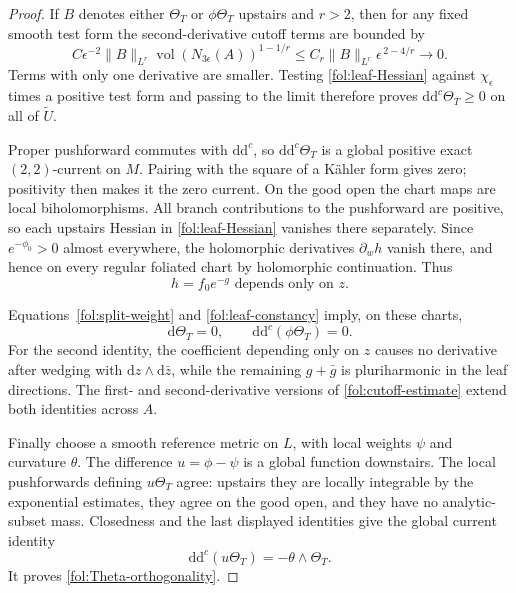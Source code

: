 \documentclass[11pt,letterpaper]{article}
\theoremstyle{definition}
\theoremstyle{remark}
\begin{document}
\begin{proof}
If $B$ denotes either $\Theta_T$ or $\phi\Theta_T$ upstairs and
$r>2$, then for any fixed smooth test form the second-derivative
cutoff terms are bounded by
\begin{equation}\label{fol:cutoff-estimate}
 C\epsilon^{-2}\|B\|_{L^r}
       \operatorname{vol}(N_{3\epsilon}(A))^{1-1/r}
 \leq C_r\|B\|_{L^r}\epsilon^{\,2-4/r}
 \longrightarrow0.
\end{equation}
Terms with only one derivative are smaller.  Testing
\eqref{fol:leaf-Hessian} against $\chi_\epsilon$ times a positive
test form and passing to the limit therefore proves
$\mathrm{d}\mathrm{d}^{c}\Theta_T\geq0$ on all of $\widetilde U$.

Proper pushforward commutes with $\mathrm{d}\mathrm{d}^{c}$, so $\mathrm{d}\mathrm{d}^{c}\Theta_T$ is a
global positive exact $(2,2)$-current on $M$.  Pairing with the square
of a K\"ahler form gives zero; positivity then makes it the zero
current.  On the good open the chart maps are local biholomorphisms.
All branch contributions to the pushforward are positive, so each
upstairs Hessian in \eqref{fol:leaf-Hessian} vanishes there separately.
Since $e^{-\phi_0}>0$ almost everywhere, the holomorphic derivatives
$\partial_w h$ vanish there, and hence on every regular foliated chart
by holomorphic continuation.  Thus
\begin{equation}\label{fol:leaf-constancy}
 h=f_0e^{-g}\text{ depends only on }z.
\end{equation}

Equations~\eqref{fol:split-weight} and \eqref{fol:leaf-constancy} imply,
on these charts,
\[
 \mathrm{d}\Theta_T=0,\qquad \mathrm{d}\mathrm{d}^{c}(\phi\Theta_T)=0.
\]
For the second identity, the coefficient depending only on $z$ causes
no derivative after wedging with $\mathrm{d} z\wedge\mathrm{d}\bar z$, while the
remaining $g+\bar g$ is pluriharmonic in the leaf directions.
The first- and second-derivative versions of
\eqref{fol:cutoff-estimate} extend both identities across $A$.

Finally choose a smooth reference metric on $L$, with local weights
$\psi$ and curvature $\theta$.  The difference $u=\phi-\psi$ is a
global function downstairs.  The local pushforwards defining
$u\Theta_T$ agree: upstairs they are locally integrable by the
exponential estimates, they agree on the good open, and they have
no analytic-subset mass.  Closedness and the last displayed identities
give the global current identity
\begin{equation}\label{fol:potential-identity}
 \mathrm{d}\mathrm{d}^{c}(u\Theta_T)=-\theta\wedge\Theta_T.
\end{equation}
It proves \eqref{fol:Theta-orthogonality}.
\end{proof}
\end{document}
